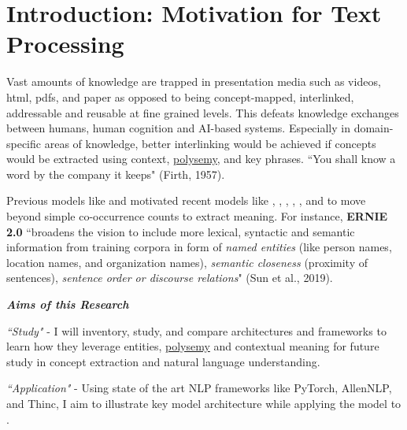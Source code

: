 \section{Introduction: Motivation for Text Processing} \label{sec:Introduction} 

Vast amounts of knowledge are trapped in presentation media such as videos, html, pdfs, and paper as opposed to being concept-mapped, interlinked, addressable and reusable at fine grained levels. This defeats knowledge exchanges between humans, human cognition and AI-based systems. Especially in domain-specific areas of knowledge, better interlinking would be achieved if concepts would be extracted using context, \hyperref[sec:Polysemy]{polysemy}, and key phrases. ``You shall know a word by the company it keeps" (Firth, 1957). 


Previous models like  and  motivated recent models like , , , , , and  to move beyond simple co-occurrence counts to extract meaning. For instance, \textbf{ERNIE 2.0} ``broadens the vision to include more lexical, syntactic and semantic information from training corpora in form of \emph{named entities} (like person names, location names, and organization names), \emph{semantic closeness} (proximity of sentences), \emph{sentence order or discourse relations}" (Sun et al., 2019). 

\emph{\textbf{Aims of this Research}}
\vspace{-7pt}
\begin{enumerateSpaced}{2pt}
    \item \emph{``Study"} - I will inventory, study, and compare architectures and frameworks to learn how they leverage entities,  \hyperref[sec:Polysemy]{polysemy} and contextual meaning for future study in concept extraction and natural language understanding.
    
    \item \emph{``Application"} - Using state of the art NLP frameworks like PyTorch, AllenNLP, and Thinc, I aim to illustrate key model architecture while applying the model  to .
\end{enumerateSpaced}
 
